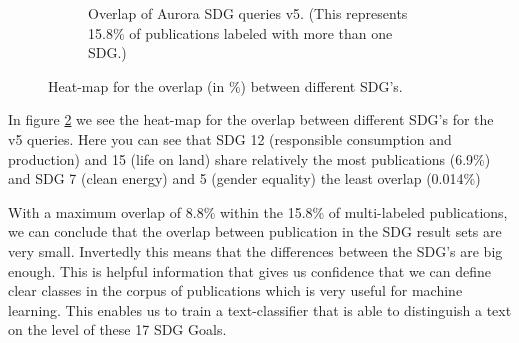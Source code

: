 \documentclass{article}
\begin{document}
\begin{figure}[H]
\begin{subfigure}{0.49\textwidth}
	    \caption{Overlap of Aurora SDG queries v5. (This represents 15.8\% of publications labeled with more than one SDG.)}
	    \label{heatmapoverlapv5}
    \end{subfigure}
    \caption{Heat-map for the overlap (in \%) between different SDG's.}
\end{figure}



In  figure \ref{heatmapoverlapv5} we see the heat-map for the overlap between different SDG's for the v5 queries. Here you can see that SDG 12 (responsible consumption and production) and 15 (life on land) share relatively the most publications (6.9\%) and SDG 7 (clean energy) and 5 (gender equality) the least overlap (0.014\%)



With a maximum overlap of 8.8\% within the 15.8\% of multi-labeled publications, we can conclude that the overlap between publication in the SDG result sets are very small. Invertedly this means that the differences between the SDG's are big enough. This is helpful information that gives us confidence that we can define clear classes in the corpus of publications which is very useful for machine learning. This enables us to train a text-classifier that is able to distinguish a text on the level of these 17 SDG Goals.
\end{document}
